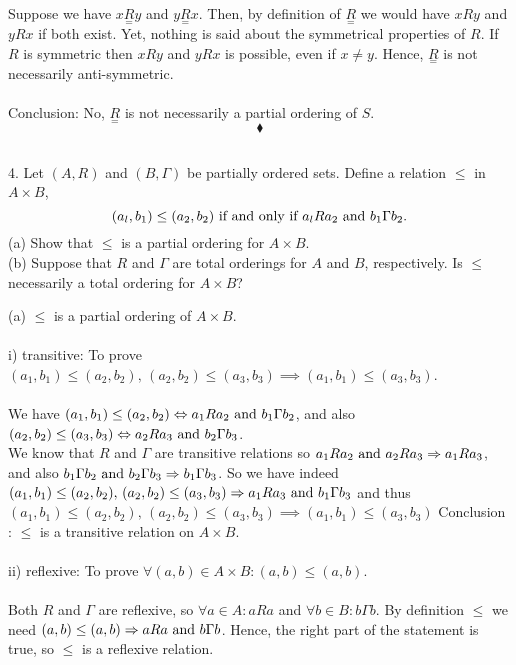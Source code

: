 Suppose  we  have $x\underset{=}{R}y$ and $y\underset{=}{R}x$. Then, by definition of $\underset{=}{R}$ we would have $xRy$ and $yRx$ if both exist. Yet, nothing is said about the symmetrical properties of $R$. If $R$ is symmetric then $xRy$ and $yRx$ is possible, even if $x\neq y$. Hence, $\underset{=}{R}$ is not necessarily anti-symmetric.\\\\
Conclusion: No, $\underset{=}{R}$ is not necessarily a partial ordering of $S$.
$$\blacklozenge$$

\subsection{}
\begin{tcolorbox}
4. Let $(A, R)$ and $(B, \Gamma)$ be partially ordered sets. Define a relation $\leq$ in $A\times B$, 
$$ (a_l, b_1) \leq (a_2, b_2) \text{ if and only if } a_l R a_2 \text{ and }  b_1\Gamma b_2.$$
(a) Show that $\leq$ is a partial ordering for $A \times B$.\\
(b) Suppose that $R$ and $\Gamma$ are total orderings for $A$ and $B$, respectively. Is $\leq$ necessarily a total ordering for $A \times B$? 
\end{tcolorbox}
$$ $$
(a) $\leq$ is a partial ordering of $A\times B$.\\\\
i) transitive: To prove $(a_1,b_1)\leq (a_2,b_2),\,(a_2,b_2)\leq (a_3,b_3)\implies (a_1,b_1)\leq (a_3,b_3)$.\\\\
We have $(a_1,b_1)\leq (a_2,b_2)\Leftrightarrow a_1Ra_2\text{ and } b_1\Gamma b_2$, and also $(a_2,b_2)\leq (a_3,b_3)\Leftrightarrow a_2Ra_3\text{ and } b_2\Gamma b_3$.\\
We know that $R$ and $\Gamma$ are transitive relations so $a_1Ra_2\text{ and } a_2Ra_3\Rightarrow a_1Ra_3$, and also $b_1\Gamma b_2\text{ and }  b_2\Gamma b_3\Rightarrow b_1\Gamma b_3$. So we have indeed $(a_1,b_1)\leq (a_2,b_2),\,(a_2,b_2)\leq (a_3,b_3)\Rightarrow a_1Ra_3 \text{ and } b_1\Gamma b_3$ and thus $(a_1,b_1)\leq (a_2,b_2),\,(a_2,b_2)\leq (a_3,b_3)\implies (a_1,b_1)\leq (a_3,b_3)$
Conclusion : $\leq$ is a transitive relation on $A\times B$.\\\\
ii) reflexive: To prove $\forall (a, b) \in A\times B: (a, b)\leq (a, b)$.\\\\
Both $R$ and $\Gamma$ are reflexive, so $\forall a\in A:aRa$ and $\forall b\in B:b\Gamma b$. By definition $\leq$ we need $(a,b)\leq (a,b)\Rightarrow aRa \text{ and } b\Gamma b$. Hence, the right part of the statement is true, so $\leq$ is a reflexive relation.\\\\
